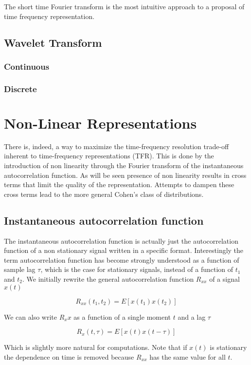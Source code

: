The short time Fourier transform is the most intuitive approach to a proposal
of time frequency representation.

\subsection{Wavelet Transform}

\subsubsection{Continuous}

\subsubsection{Discrete}

\section{Non-Linear Representations}

There is, indeed, a way to maximize the time-frequency resolution trade-off
inherent to time-frequency representations (TFR)\cite{HERE BRO}. This is done by the
introduction of non linearity through the Fourier transform of the
instantaneous autocorrelation function. As will be seen presence of non
linearity results in cross terms that limit the quality of the representation.
Attempts to dampen these cross terms lead to the more general Cohen's class of
distributions.

\subsection{Instantaneous autocorrelation function}

The instantaneous autocorrelation function is actually just the autocorrelation
function of a non stationary signal written in a specific format.
Interestingly the term autocorrelation function has become strongly understood
as a function of sample lag $\tau$, which is the case for stationary signals,
instead of a function of $t_1$ and $t_2$. We initially rewrite the general
autocorrelation function $R_{xx}$ of a signal $x(t)$

$$ R_{xx}(t_1, t_2) = E[x(t_1)x(t_2)] $$

We can also write $R_xx$ as a function of a single moment $t$ and a lag $\tau$

$$ R_{x}(t, \tau) = E[x(t)x(t-\tau)] $$

Which is slightly more natural for computations. Note that if $x(t)$ is
stationary the dependence on time is removed because $R_{xx}$ has the same
value for all $t$.

